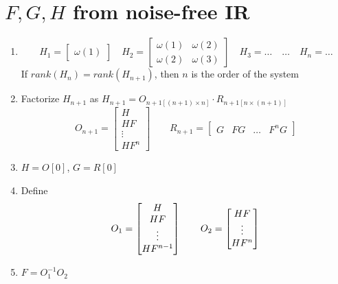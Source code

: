 \documentclass{report}
\begin{document}
\section{$F,G,H$ from noise-free IR}
\begin{enumerate}
\item
	\[
	H_1=\begin{bmatrix}
	\omega(1)
	\end{bmatrix}
	\quad
	H_2=\begin{bmatrix}
	\omega(1)&\omega(2)\\
	\omega(2)&\omega(3)
	\end{bmatrix}
	\quad
	H_3=\dots
	\quad
	\dots
	\quad
	H_n=\dots
	\]
	If $rank(H_n)=rank(H_{n+1})$, then $n$ is the order of the system 
\item Factorize $H_{n+1}$ as $H_{n+1}=O_{n+1[(n+1)\times n]}\cdot R_{n+1[n\times(n+1)]}$
	\[
	O_{n+1}=\begin{bmatrix}
	H\\HF\\\vdots\\HF^n
	\end{bmatrix}
	\qquad
	R_{n+1}=\begin{bmatrix}
	G&FG&\dots&F^nG
	\end{bmatrix}
	\]
\item $H=O[0]$, $G=R[0]$
\item Define\[
	O_1=\begin{bmatrix}
	H\\HF\\\vdots\\HF^{n-1}
	\end{bmatrix}
	\qquad
	O_2=\begin{bmatrix}
	HF\\\vdots\\HF^n
	\end{bmatrix}\\
	\]
\item $F=O_1^{-1}O_2$
\end{enumerate}
\end{document}
